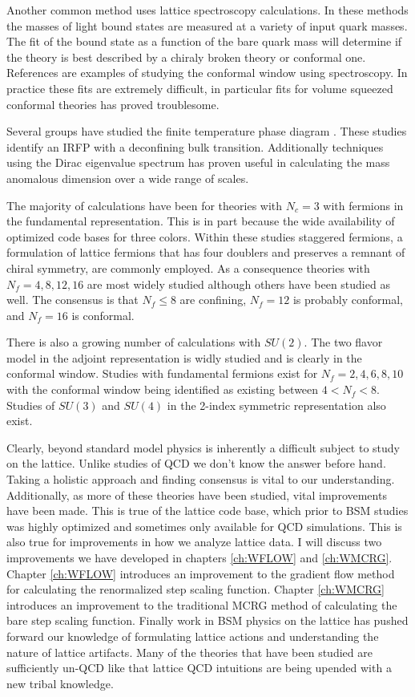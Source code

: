 Another common method uses lattice spectroscopy calculations.
In these methods the masses of light bound states are measured at a variety of input quark masses.
The fit of the bound state as a function of the bare quark mass will determine if the theory is best described by a chiraly broken theory or conformal one.
References \cite{Jin:2008rc,Jin:2009mc,Fodor:2010zzb} are examples of studying the conformal window using spectroscopy.
In practice these fits are extremely difficult, in particular fits for volume squeezed conformal theories has proved troublesome.

Several groups have studied the finite temperature phase diagram \cite{Iwasaki:2003de,Schaich:2012fr}.
These studies identify an IRFP with a deconfining bulk transition.
Additionally techniques using the Dirac eigenvalue spectrum \cite{Cheng:2013eu} has proven useful in calculating the mass anomalous dimension over a wide range of scales.

The majority of calculations have been for theories with $N_c=3$ with fermions in the fundamental representation.
This is in part because the wide availability of optimized code bases for three colors.
Within these studies staggered fermions, a formulation of lattice fermions that has four doublers and preserves a remnant of chiral symmetry, are commonly employed.
As a consequence theories with $N_f=4,8,12,16$ are most widely studied although others have been studied as well.
The consensus is that $N_f\le8$ are confining, $N_f=12$ is probably conformal, and $N_f=16$ is conformal.

There is also a growing number of calculations with $SU(2)$.
The two flavor model in the adjoint representation is widly studied and is clearly in the conformal window\cite{Catterall:2007yx,DelDebbio:2010hu,DeGrand:2011qd,DeGrand:2011vp}.
Studies with fundamental fermions exist for $N_f=2,4,6,8,10$ with the conformal window being identified as existing between $4<N_f<8$.
Studies of $SU(3)$ and $SU(4)$ in the 2-index symmetric representation also exist.

Clearly, beyond standard model physics is inherently a difficult subject to study on the lattice.
Unlike studies of QCD we don't know the answer before hand.
Taking a holistic approach and finding consensus is vital to our understanding.
Additionally, as more of these theories have been studied, vital improvements have been made.
This is true of the lattice code base, which prior to BSM studies was highly optimized and sometimes only available for QCD simulations.
This is also true for improvements in how we analyze lattice data.
I will discuss two improvements we have developed in chapters \ref{ch:WFLOW} and \ref{ch:WMCRG}.
Chapter \ref{ch:WFLOW} introduces an improvement to the gradient flow method for calculating the renormalized step scaling function.
Chapter \ref{ch:WMCRG} introduces an improvement to the traditional MCRG method of calculating the bare step scaling function.
Finally work in BSM physics on the lattice has pushed forward our knowledge of formulating lattice actions and understanding the nature of lattice artifacts.
Many of the theories that have been studied are sufficiently un-QCD like that lattice QCD intuitions are being upended with a new tribal knowledge.
